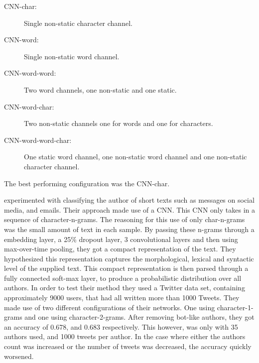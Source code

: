 \begin{description}
    \item[CNN-char:] Single non-static character channel.
    \item[CNN-word:] Single non-static word channel.
    \item[CNN-word-word:] Two word channels, one non-static and one static.
    \item[CNN-word-char:] Two non-static channels one for words and one for
        characters.
    \item[CNN-word-word-char:] One static word channel, one non-static word
        channel and one non-static character channel.
\end{description}

\noindent
The best performing configuration was the CNN-char.

\citet{shrestha2017} experimented with classifying the author of short texts
such as messages on social media, and emails. Their approach made use of a
\gls{CNN}. This \gls{CNN} only takes in a sequence of character-n-grams. The
reasoning for this use of only char-n-grams was the small amount of text in
each sample. By passing these n-grams through a embedding layer, a 25\% dropout
layer, 3 convolutional layers and then using max-over-time pooling, they got
a compact representation of the text. They hypothesized this representation
captures the morphological, lexical and syntactic level of the supplied text.
This compact representation is then parsed through a fully connected soft-max
layer, to produce a probabilistic distribution over all authors. In order
to test their method they used a Twitter data set, containing approximately
9000 users, that had all written more than 1000 Tweets. They made use of two
different configurations of their networks. One using character-1-grams and one
using character-2-grams. After removing bot-like authors, they got an accuracy
of 0.678, and 0.683 respectively. This however, was only with 35 authors used,
and 1000 tweets per author. In the case where either the authors count was
increased or the number of tweets was decreased, the accuracy quickly worsened.

